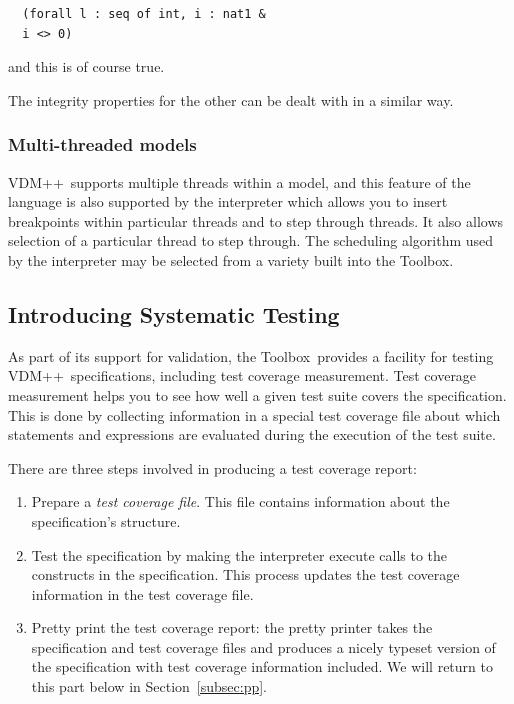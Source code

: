 \documentclass[\pformat,12pt]{article}
\newcommand{\vdmslpp}{VDM++}
\newcommand{\Toolbox}{Toolbox}
\begin{document}
\begin{verbatim}
  (forall l : seq of int, i : nat1 &
  i <> 0)
\end{verbatim}

and this is of course true.


The integrity properties for the other
 can be dealt with in
a similar way.


\subsubsection{Multi-threaded models}

\vdmslpp\ supports multiple threads within a model, and this feature of the
language is also supported by the interpreter which allows you to
insert breakpoints within particular threads and to step
through threads. It also allows selection of a particular thread to
step through. The scheduling algorithm used by the interpreter may be
selected from a variety built into the \Toolbox.



\subsection{Introducing Systematic Testing}
\label{tour:testing}

As part of its support for validation, the \Toolbox\ provides a
facility for testing \vdmslpp\ specifications, including test
  coverage measurement.  Test coverage measurement helps you to see
how well a given test suite covers the
specification. This is done by collecting information in a special
test coverage file about which statements and expressions are
evaluated during the execution of the test suite.

There are three steps involved in producing a test coverage report:


\begin{enumerate}
\item
Prepare a {\em test coverage file}. This file contains
  information about the specification's structure. 
\item Test the specification by making the interpreter execute calls
to the constructs in the specification. This process updates the test
coverage information in the test coverage file.
\item Pretty print the test coverage report: the pretty printer takes
  the specification and test coverage files and produces a nicely typeset
  version of the specification with test coverage information
  included. We will return to this part below in Section~\ref{subsec:pp}.

\end{enumerate}
\end{document}
